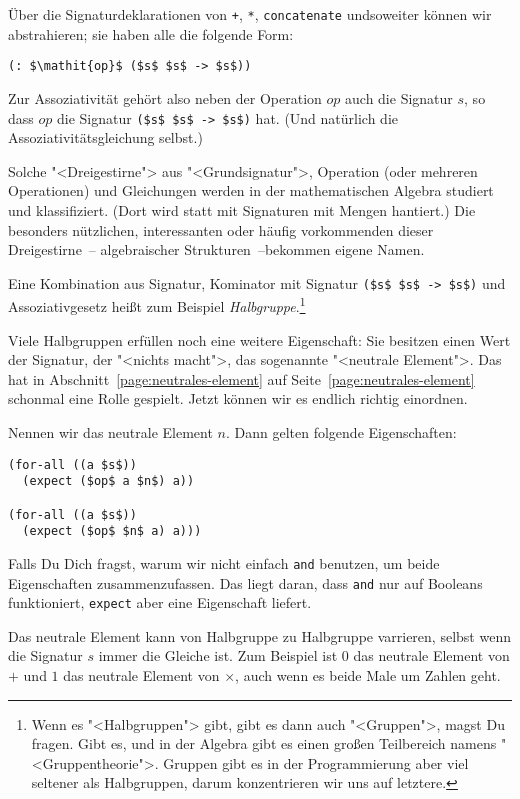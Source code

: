 Über die Signaturdeklarationen von \lstinline{+}, \lstinline{*},
\lstinline{concatenate} undsoweiter können wir abstrahieren; sie haben
alle die folgende Form:
%
\begin{lstlisting}
(: $\mathit{op}$ ($s$ $s$ -> $s$))
\end{lstlisting}
%
Zur Assoziativität gehört also neben der Operation $op$ auch die
Signatur $s$, so dass $op$ die Signatur \lstinline{($s$ $s$ -> $s$)}
hat.  (Und natürlich die Assoziativitätsgleichung selbst.)

Solche "<Dreigestirne"> aus "<Grundsignatur">, Operation (oder
mehreren Operationen) und Gleichungen werden in der mathematischen
Algebra studiert und klassifiziert.  (Dort wird statt
mit Signaturen mit Mengen hantiert.)  Die besonders nützlichen,
interessanten oder häufig vorkommenden dieser Dreigestirne~--
algebraischer Strukturen~--bekommen eigene Namen.

Eine Kombination aus Signatur, Kominator mit Signatur
\lstinline{($s$ $s$ -> $s$)}
und Assoziativgesetz heißt zum Beispiel
\textit{Halbgruppe}.\footnote{Wenn es "<Halbgruppen"> gibt,
gibt es dann auch "<Gruppen">, magst Du fragen.  Gibt es, und in der
Algebra gibt es einen großen Teilbereich namens "<Gruppentheorie">.
Gruppen gibt es in der Programmierung aber viel seltener als
Halbgruppen, darum konzentrieren wir uns auf letztere.}

Viele Halbgruppen erfüllen noch eine weitere Eigenschaft: Sie besitzen
einen Wert der Signatur, der "<nichts macht">, das sogenannte
"<neutrale Element">. Das hat in
Abschnitt~\ref{page:neutrales-element} auf
Seite~\ref{page:neutrales-element} schonmal eine Rolle gespielt.
Jetzt können wir es endlich richtig einordnen.

Nennen wir das neutrale Element $n$.  Dann gelten folgende
Eigenschaften:
%
\begin{lstlisting}
(for-all ((a $s$))
  (expect ($op$ a $n$) a))

(for-all ((a $s$))
  (expect ($op$ $n$ a) a)))
\end{lstlisting}
%
Falls Du Dich fragst, warum wir nicht einfach \lstinline{and}
benutzen, um beide Eigenschaften zusammenzufassen.  Das liegt daran,
dass \lstinline{and} nur auf Booleans funktioniert, \lstinline{expect}
aber eine Eigenschaft liefert.

Das neutrale Element kann von Halbgruppe zu Halbgruppe varrieren,
selbst wenn die Signatur $s$ immer die Gleiche ist.  Zum Beispiel ist
$0$ das neutrale Element von $+$ und $1$ das neutrale Element von
$\times$, auch wenn es beide Male um Zahlen geht.


